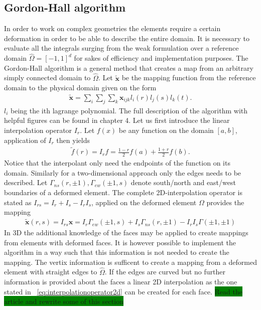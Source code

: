 \subsection{Gordon-Hall algorithm}
In order to work on complex geometries the elements require a certain deformation in order to be able 
to describe the entire domain. It is necessary to evaluate all the integrals surging from the weak formulation over 
a reference domain $\hat{\Omega} = [-1,1]^d$ for sakes of efficiency and implementation purposes. The Gordon-Hall 
algorithm is a general method that creates a map from an arbitrary simply connected domain to $\hat{\Omega}$.
Let $\mathbf{\tilde{x}}$ be the mapping function from the reference domain to the physical domain given on the form 
%
\begin{align}
    \mathbf{\tilde{x}}= \sum_i \sum_j \sum_k \mathbf{x}_{ijk}l_i(r) l_j(s) l_k(t).
    \label{eq:mapping}
\end{align}
%
$l_i$ being the ith lagrange polynomial.
The full description of the algorithm with helpful figures can be found in \cite{Deville} chapter 4.
Let us first introduce the linear interpolation operator $I_r$. Let $f(x)$ be any function on the domain $[a,b]$, 
application of $I_r$ then yields 
\begin{align}
    \tilde{f}(r) = I_rf = \frac{1-r}{2}f(a) + \frac{1+r}{2}f(b).
    \label{eq:interpolationoperator}
\end{align}
Notice that the interpolant only need the endpoints of the function on its domain.
Similarly for a two-dimensional approach only the edges needs to be described. 
Let $\Gamma_{ns}(r,\pm 1), \Gamma_{ew}(\pm 1,s) $ denote south/north and east/west boundaries of a deformed element.
The complete 2D-interpolation operator is stated as $I_{rs} = I_r+I_s-I_rI_s$,
applied on the deformed element $\Omega$ provides the mapping
%
\begin{align}
    \mathbf{\tilde{x}}(r,s) = 
    I_{rs}\mathbf{x} = 
    I_r\Gamma_{ew}(\pm 1,s)+I_s\Gamma_{ns}(r,\pm 1)-I_rI_s\Gamma(\pm 1,\pm 1)
    \label{eq:interpolationoperator2d}
\end{align}
%
In 3D the additional knowledge of the faces may be applied to create mappings from elements with deformed faces.
It is however possible to implement the algorithm in a way such that this information is not needed to create the mapping.
The vertix information is sufficent to create a mapping from a deformed element
with straight edges to $\hat{\Omega}$. If the edges are curved but no further information is provided about the faces 
a linear 2D interpolation as the one stated in ~\ref{eq:interpolationoperator2d} can be created for each face. 
\colorbox{green}{Read the article and rewrite some of this section}



